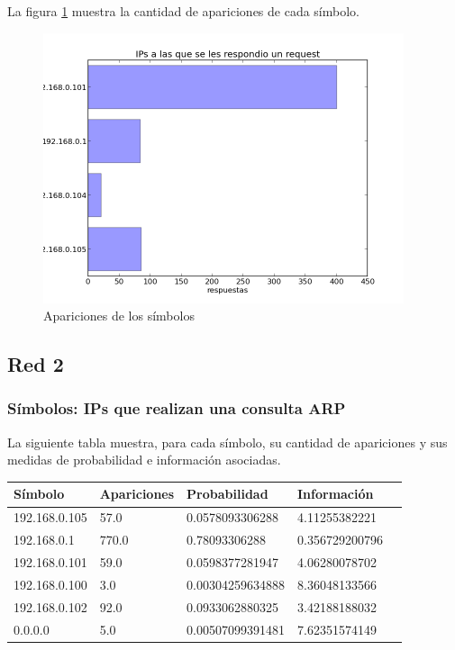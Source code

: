 \documentclass{article}
\begin{document}
La figura \ref{fig:red1replied:count} muestra la cantidad de apariciones de
cada símbolo.

\begin{figure}[h!]
    \centering
    \includegraphics[width=300pt]{red1replied.png}
    \caption{Apariciones de los símbolos}
    \label{fig:red1replied:count}
\end{figure}
\newpage


\subsection{Red 2}
\subsubsection{Símbolos: IPs que realizan una consulta ARP}
La siguiente tabla muestra, para cada símbolo, su cantidad de apariciones y
sus medidas de probabilidad e información asociadas.

\vskip10pt

\begin{tabular}{|l|l|l|l|l|}
  \hline
  Símbolo & Apariciones & Probabilidad & Información \\
  \hline
  192.168.0.105 & 57.0 & 0.0578093306288 & 4.11255382221\\
\hline
192.168.0.1 & 770.0 & 0.78093306288 & 0.356729200796\\
\hline
192.168.0.101 & 59.0 & 0.0598377281947 & 4.06280078702\\
\hline
192.168.0.100 & 3.0 & 0.00304259634888 & 8.36048133566\\
\hline
192.168.0.102 & 92.0 & 0.0933062880325 & 3.42188188032\\
\hline
0.0.0.0 & 5.0 & 0.00507099391481 & 7.62351574149\\
\hline

\end{tabular}
\end{document}
